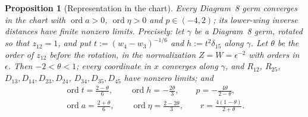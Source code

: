 \documentclass[Threeside,11pt]{article}
\newtheorem{proposition}[theorem]{Proposition}
\theoremstyle{definition}
\theoremstyle{remark}
\numberwithin{equation}{section}
\theoremstyle{remark}
\newcommand{\ord}{\operatorname{ord}}
\begin{document}
\begin{proposition}[Representation in the chart]\label{prop:d8-cover}
Every Diagram~8 germ converges in the chart with $\ord a>0$,
$\ord\eta>0$ and $p\in(-4,2)$; its lower-wing inverse distances have finite
nonzero limits.  Precisely: let $\gamma$ be a Diagram~8 germ, rotated so that $z_{12}=1$, and put
$t:=(w_4-w_3)^{-1/6}$ and $h:=t^2\delta_{15}$ along $\gamma$.  Let $\theta$ be the order of
$z_{12}$ before the rotation, in the normalization $Z=W=\epsilon^{-2}$ with orders in $\epsilon$.
Then $-2<\theta<1$; every coordinate in $x$ converges along $\gamma$, and $R_{12}$, $R_{25}$,
$D_{13},D_{14},D_{23},D_{24}$, $D_{34},D_{35},D_{45}$ have nonzero limits; and
\begin{gather*}
  \ord t=\tfrac{2-\theta}6,\qquad \ord h=-\tfrac{2\theta}3,\qquad
  p=-\tfrac{4\theta}{2-\theta},\\
  \ord a=\tfrac{2+\theta}6,\qquad \ord\eta=\tfrac{2-2\theta}3,\qquad
  r=\tfrac{4(1-\theta)}{2+\theta}.
\end{gather*}
\end{proposition}
\end{document}

